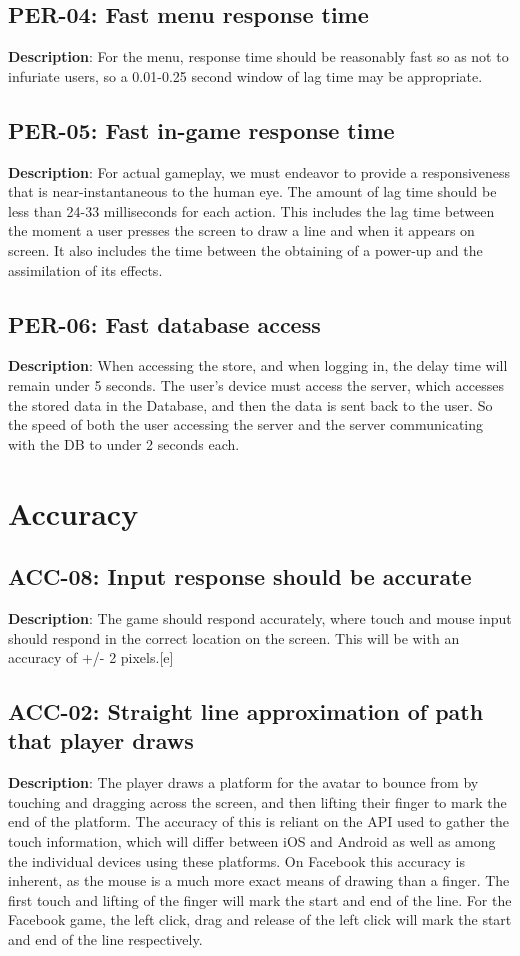 \subsection{PER-04: Fast menu response time}
\textbf{Description}: For the menu, response time should be reasonably fast
so as not to infuriate users, so a 0.01-0.25 second window of lag
time may be appropriate.
\subsection{PER-05: Fast in-game response time}
\textbf{Description}: For actual gameplay, we must endeavor to provide a responsiveness
that is near-instantaneous to the human eye. The amount of lag time
should be less than 24-33 milliseconds for each action. This includes
the lag time between the moment a user presses the screen to draw
a line and when it appears on screen. It also includes the time between
the obtaining of a power-up and the assimilation of its effects.
\subsection{PER-06: Fast database access}
\textbf{Description}: When accessing the store, and when logging in, the delay
time will remain under 5 seconds. The user\textquoteright{}s device
must access the server, which accesses the stored data in the Database,
and then the data is sent back to the user. So the speed of both the
user accessing the server and the server communicating with the DB
to under 2 seconds each.
\section{Accuracy}
\subsection{ACC-08: Input response should be accurate}
\textbf{Description}: The game should respond accurately, where touch and mouse
input should respond in the correct location on the screen. This will
be with an accuracy of +/- 2 pixels.{[}e{]}
\subsection{ACC-02: Straight line approximation of path that player draws}
\textbf{Description}: The player draws a platform for the avatar to bounce
from by touching and dragging across the screen, and then lifting
their finger to mark the end of the platform. The accuracy of this
is reliant on the API used to gather the touch information, which
will differ between iOS and Android as well as among the individual
devices using these platforms. On Facebook this accuracy is inherent,
as the mouse is a much more exact means of drawing than a finger.
The first touch and lifting of the finger will mark the start and
end of the line. For the Facebook game, the left click, drag and release
of the left click will mark the start and end of the line respectively.
